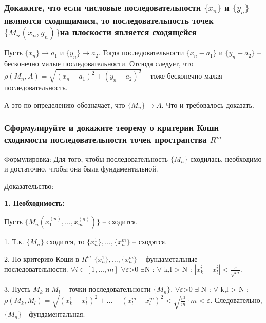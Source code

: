 \documentclass[a4paper, 12pt]{article}
\renewcommand{\epsilon}{\varepsilon}
\newcommand{\Rm}{\texorpdfstring{$R^m$}{Lg}}
\def\newline{}%
\begin{document}
            \subsubsection{Докажите, что если числовые последовательности \texorpdfstring{$\{x_n\}$}{Lg}
            и \texorpdfstring{$\{y_n\}$}{Lg}\newline являются сходящимися, то последовательность точек
            \texorpdfstring{$\{M_n(x_n, y_n)\}$}{Lg}\newline на плоскости является сходящейся}

            Пусть $\{x_n\} \rightarrow a_1$ и $\{y_n\} \rightarrow a_2$. Тогда последовательности
            $\{x_n - a_1\}$ и $\{y_n - a_2\}$ -- бесконечно малые последовательности. Отсюда следует, что \newline$\rho(M_n, A)
            = \sqrt{(x_n - a_1)^2 + (y_n - a_2)^2}$ -- тоже бесконечно малая последовательность.

            А это по определению обозначает, что $\{M_n\} \rightarrow A$. Что и требовалось доказать.


            \subsubsection{Сформулируйте и докажите теорему о критерии Коши сходимости
            последовательности точек пространства \Rm}

            Формулировка: Для того, чтобы последовательность $\{M_n\}$ сходилась,
            необходимо и достаточно, чтобы она была фундаментальной.

            Доказательство:

            \textbf{1. Необходимость:}

            Пусть $\{M_n(x_1^{(n)}, \ldots, x_m^{(n)})\}$ -- сходится.

            1. Т.к. $\{M_n\}$ сходится, то $\{x_n^1\}, \ldots, \{x_n^m\}$ -- сходятся.

            2. По критерию Коши в $R^m$ $\{x_n^1\}, \ldots, \{x_n^m\}$ -- фундаметальные последовательности.\newline
            $\forall i \in [1,\ldots,m]$ $\forall \epsilon$>0 $\exists$N : $\forall$ k,l > N :
            $|x_k^i - x_l^i| < \frac{\epsilon}{\sqrt{m}}$.

            3. Пусть $M_k$ и $M_l$ -- точки последовательности $\{M_n\}$.\newline
            $\forall \epsilon$>0 $\exists$ N : $\forall$ k,l > N :
            $\rho(M_k, M_l) = \sqrt{(x_k^1 - x_l^1)^2 + \ldots + (x_l^m - x_l^m)^2} < \sqrt{\frac{{\epsilon}^2}{m}\cdot m} < \epsilon$.\newline
            Следовательно, $\{M_n\}$ - фундаментальная.
\end{document}
